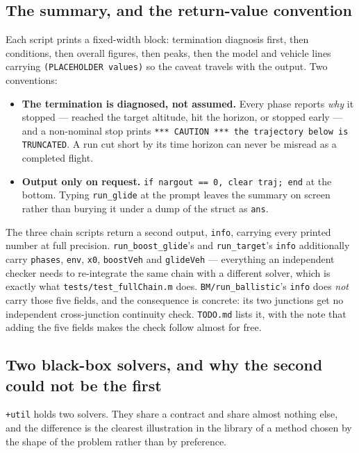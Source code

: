\documentclass[11pt]{article}
\newcommand{\code}[1]{\texttt{#1}}
\newcommand{\pkg}[1]{\texttt{+#1}}
\begin{document}
\subsection{The summary, and the return-value convention}

Each script prints a fixed-width block: termination diagnosis first, then
conditions, then overall figures, then peaks, then the model and vehicle lines
carrying \code{(PLACEHOLDER values)} so the caveat travels with the output.
Two conventions:

\begin{itemize}
\item \textbf{The termination is diagnosed, not assumed.} Every phase reports
\emph{why} it stopped --- reached the target altitude, hit the horizon, or
stopped early --- and a non-nominal stop prints
\code{*** CAUTION *** the trajectory below is TRUNCATED}. A run cut short by
its time horizon can never be misread as a completed flight.
\item \textbf{Output only on request.} \code{if nargout == 0, clear traj; end}
at the bottom. Typing \code{run\_glide} at the prompt leaves the summary on
screen rather than burying it under a dump of the struct as \code{ans}.
\end{itemize}

The three chain scripts return a second output, \code{info}, carrying every
printed number at full precision. \code{run\_boost\_glide}'s and
\code{run\_target}'s \code{info} additionally carry \code{phases}, \code{env},
\code{x0}, \code{boostVeh} and \code{glideVeh} --- everything an independent
checker needs to re-integrate the same chain with a different solver, which is
exactly what \code{tests/test\_fullChain.m} does.
\code{BM/run\_ballistic}'s \code{info} does \emph{not} carry those five fields,
and the consequence is concrete: its two junctions get no independent
cross-junction continuity check. \code{TODO.md} lists it, with the note that
adding the five fields makes the check follow almost for free.

\subsection{Two black-box solvers, and why the second could not be the first}
\label{sec:solvers}

\pkg{util} holds two solvers. They share a contract and share almost nothing
else, and the difference is the clearest illustration in the library of a
method chosen by the shape of the problem rather than by preference.
\end{document}
